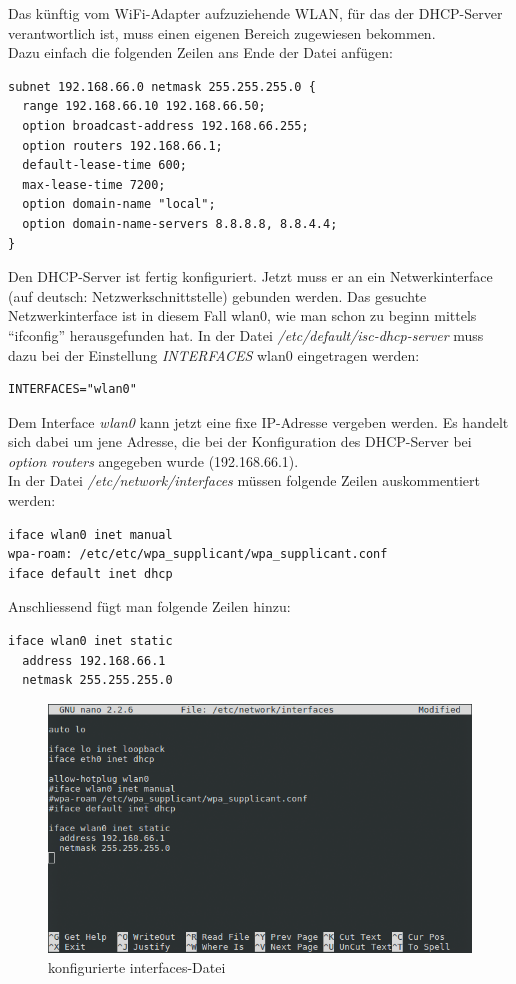 Das künftig vom WiFi-Adapter aufzuziehende WLAN, für das der DHCP-Server verantwortlich ist, muss einen eigenen Bereich zugewiesen bekommen.
\\
Dazu einfach die folgenden Zeilen ans Ende der Datei anfügen:

\begin{lstlisting}
subnet 192.168.66.0 netmask 255.255.255.0 {
  range 192.168.66.10 192.168.66.50;
  option broadcast-address 192.168.66.255;
  option routers 192.168.66.1;
  default-lease-time 600;
  max-lease-time 7200;
  option domain-name "local";
  option domain-name-servers 8.8.8.8, 8.8.4.4;
}
\end{lstlisting}

Den DHCP-Server ist fertig konfiguriert. Jetzt muss er an ein Netwerkinterface (auf deutsch: Netzwerkschnittstelle) gebunden werden. Das gesuchte Netzwerkinterface ist in diesem Fall wlan0, wie man schon zu beginn mittels ``ifconfig'' herausgefunden hat.
In der Datei \textit{/etc/default/isc-dhcp-server} muss dazu bei der Einstellung \textit{INTERFACES} wlan0 eingetragen werden:

\begin{lstlisting}
INTERFACES="wlan0"
\end{lstlisting}

Dem Interface \textit{wlan0} kann jetzt eine fixe IP-Adresse vergeben werden. Es handelt sich dabei um jene Adresse, die bei der Konfiguration des DHCP-Server bei \textit{option routers} angegeben wurde (192.168.66.1). 
\\
In der Datei \textit{/etc/network/interfaces} müssen folgende Zeilen auskommentiert werden:

\begin{lstlisting}
iface wlan0 inet manual
wpa-roam: /etc/etc/wpa_supplicant/wpa_supplicant.conf
iface default inet dhcp
\end{lstlisting}

Anschliessend fügt man folgende Zeilen hinzu:

\begin{lstlisting}
iface wlan0 inet static
  address 192.168.66.1
  netmask 255.255.255.0
\end{lstlisting}

\begin{figure}[h]
\centering
\includegraphics[scale=0.7]{images/network_interfaces}
\caption{konfigurierte interfaces-Datei}
\end{figure}

